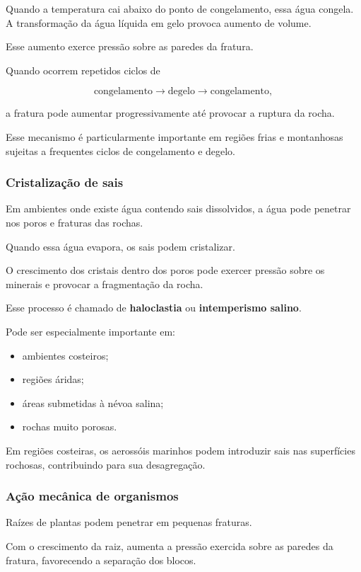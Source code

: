 \documentclass[a4paper,12pt]{article}
\theoremstyle{definition}
\theoremstyle{definition}
\theoremstyle{definition}
\begin{document}
Quando a temperatura cai abaixo do ponto de congelamento, essa água congela. A transformação da água líquida em gelo provoca aumento de volume.

Esse aumento exerce pressão sobre as paredes da fratura.

Quando ocorrem repetidos ciclos de

\[
\text{congelamento}
\rightarrow
\text{degelo}
\rightarrow
\text{congelamento},
\]

a fratura pode aumentar progressivamente até provocar a ruptura da rocha.

Esse mecanismo é particularmente importante em regiões frias e montanhosas sujeitas a frequentes ciclos de congelamento e degelo.

\subsubsection{Cristalização de sais}

Em ambientes onde existe água contendo sais dissolvidos, a água pode penetrar nos poros e fraturas das rochas.

Quando essa água evapora, os sais podem cristalizar.

O crescimento dos cristais dentro dos poros pode exercer pressão sobre os minerais e provocar a fragmentação da rocha.

Esse processo é chamado de \textbf{haloclastia} ou \textbf{intemperismo salino}.

Pode ser especialmente importante em:

\begin{itemize}
    \item ambientes costeiros;
    \item regiões áridas;
    \item áreas submetidas à névoa salina;
    \item rochas muito porosas.
\end{itemize}

Em regiões costeiras, os aerossóis marinhos podem introduzir sais nas superfícies rochosas, contribuindo para sua desagregação.

\subsubsection{Ação mecânica de organismos}

Raízes de plantas podem penetrar em pequenas fraturas.

Com o crescimento da raiz, aumenta a pressão exercida sobre as paredes da fratura, favorecendo a separação dos blocos.
\end{document}
